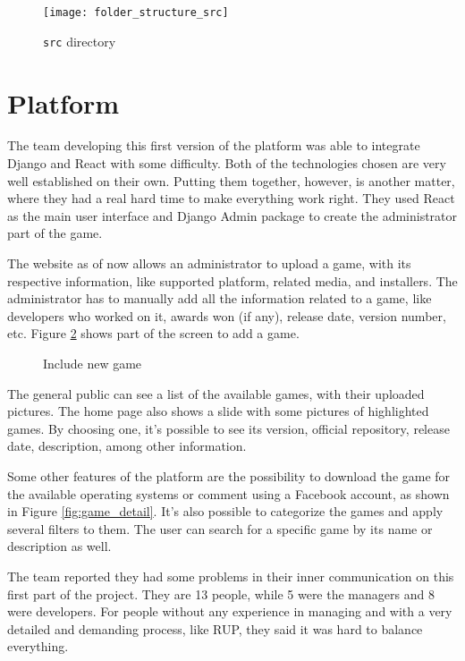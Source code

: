 \begin{figure}[h!]
\centering
\texttt{[image: folder\_structure\_src]}
\caption{\texttt{src} directory}
\label {fig:folder_structure_src}
\end{figure}

\section{Platform}
\label {sec:platform}

The team developing this first version of the platform was able to integrate Django and React with some difficulty. Both of the technologies chosen are very well established on their own. Putting them together, however, is another matter, where they had a real hard time to make everything work right. They used React as the main user interface and Django Admin package to create the administrator part of the game.

The website as of now allows an administrator to upload a game, with its respective information, like supported platform, related media, and installers.
The administrator has to manually add all the information related to a game, like developers who worked on it, awards won (if any), release date, version number, etc. Figure \ref{fig:include_game1} shows part of the screen to add a game.

\begin{figure}[h!]
\centering
{}
\caption{Include new game}
\label {fig:include_game1}
\end{figure}

The general public can see a list of the available games, with their uploaded pictures. The home page also shows a slide with some pictures of highlighted games. By choosing one, it's possible to see its version, official repository, release date, description, among other information.

Some other features of the platform are the possibility to download the game for the available operating systems or comment using a Facebook account, as shown in Figure \ref{fig:game_detail}. It's also possible to categorize the games and apply several filters to them. The user can search for a specific game by its name or description as well.

The team reported they had some problems in their inner communication on this first part of the project. They are 13 people, while 5 were the managers and 8 were developers. For people without any experience in managing and with a very detailed and demanding process, like RUP, they said it was hard to balance everything.

